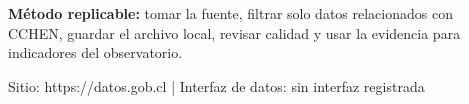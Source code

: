 \documentclass[9pt,a4paper]{extarticle}
\begin{document}
\vspace{0.06cm}
\begin{tcolorbox}[enhanced,colback=white,colframe=cchenpurple!55,boxrule=0.45pt,arc=2pt,left=6pt,right=6pt,top=5pt,bottom=5pt]
{\bfseries\color{cchenpurple}Método replicable:} tomar la fuente, filtrar solo datos relacionados con CCHEN, guardar el archivo local, revisar calidad y usar la evidencia para indicadores del observatorio.
\end{tcolorbox}

\vspace{0.02cm}
{\scriptsize\color{mutedgray}Sitio: https://datos.gob.cl \quad | \quad Interfaz de datos: sin interfaz registrada}
\end{document}
